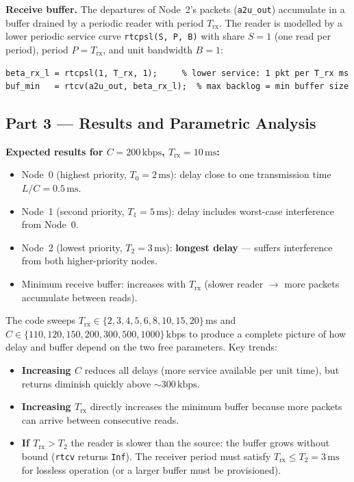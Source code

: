 \documentclass[12pt, a4paper]{article}
\begin{document}
\textbf{Receive buffer.}
The departures of Node~2's packets (\texttt{a2u\_out}) accumulate in a buffer
drained by a periodic reader with period $T_\mathrm{rx}$.
The reader is modelled by a lower periodic service curve
\texttt{rtcpsl(S, P, B)} with share $S=1$ (one read per period), period
$P = T_\mathrm{rx}$, and unit bandwidth $B=1$:

\begin{lstlisting}[style=matlab]
beta_rx_l = rtcpsl(1, T_rx, 1);     % lower service: 1 pkt per T_rx ms
buf_min   = rtcv(a2u_out, beta_rx_l);  % max backlog = min buffer size
\end{lstlisting}

\subsection*{Part 3 --- Results and Parametric Analysis}

\begin{keybox}
  \textbf{Expected results for $C = 200\,\text{kbps}$, $T_\mathrm{rx} = 10\,\text{ms}$:}
  \begin{itemize}[leftmargin=1.2em, itemsep=3pt]
    \item Node~0 (highest priority, $T_0=2\,\text{ms}$):
      delay close to one transmission time $L/C = 0.5\,\text{ms}$.
    \item Node~1 (second priority, $T_1=5\,\text{ms}$):
      delay includes worst-case interference from Node~0.
    \item Node~2 (lowest priority, $T_2=3\,\text{ms}$):
      \textbf{longest delay} --- suffers interference from both higher-priority nodes.
    \item Minimum receive buffer: increases with $T_\mathrm{rx}$
      (slower reader $\to$ more packets accumulate between reads).
  \end{itemize}
\end{keybox}

The code sweeps $T_\mathrm{rx} \in \{2, 3, 4, 5, 6, 8, 10, 15, 20\}$\,ms
and $C \in \{110, 120, 150, 200, 300, 500, 1000\}$\,kbps to produce a
complete picture of how delay and buffer depend on the two free parameters.
Key trends:

\begin{itemize}[leftmargin=1.4em, itemsep=3pt]
  \item \textbf{Increasing $C$} reduces all delays (more service available per
    unit time), but returns diminish quickly above $\sim 300\,\text{kbps}$.
  \item \textbf{Increasing $T_\mathrm{rx}$} directly increases the minimum buffer
    because more packets can arrive between consecutive reads.
  \item \textbf{If $T_\mathrm{rx} > T_2$} the reader is slower than the source:
    the buffer grows without bound (\texttt{rtcv} returns \texttt{Inf}).
    The receiver period must satisfy $T_\mathrm{rx} \leq T_2 = 3\,\text{ms}$ for
    lossless operation (or a larger buffer must be provisioned).
\end{itemize}
\end{document}
